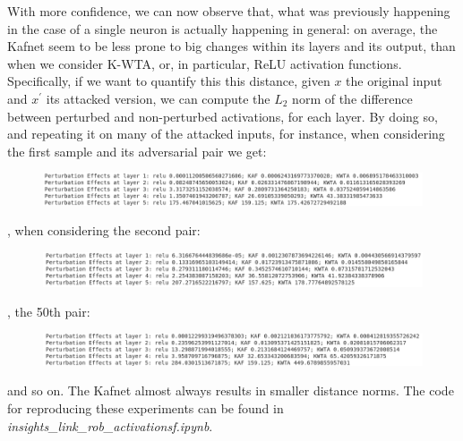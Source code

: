 \documentclass[LaM,binding=0.6cm]{./packages/sapthesis/sapthesis}
\begin{document}
        
        \newpage
        With more confidence, we can now observe that, what was previously happening in the case of a single neuron is actually happening in general: on average,
        the Kafnet seem to be less prone to big changes within its layers and its output, than when we consider K-WTA, or, in particular, ReLU activation functions.  
        Specifically, if we want to quantify this this distance, given $x$ the original input and $x^{\prime}$ its attacked version, we can compute the $L_2$ norm of the difference between perturbed 
        and non-perturbed activations, for each layer. By doing so, and repeating it on many of the attacked inputs, for instance, when considering the first sample and its adversarial pair we get:
        \begin{figure}[h!!]
            \centering
            \includegraphics[width=1.0\textwidth]{actdist31}
        \end{figure}
       \newline
        , when considering the second pair:
        \begin{figure}[h!!]
            \centering
            \includegraphics[width=1.0\textwidth]{actdist32}
        \end{figure}
        \newline
        , the 50th pair:
        \begin{figure}[h!!]
            \centering
            \includegraphics[width=1.0\textwidth]{actdist33}
        \end{figure}
        \newline
        and so on. The Kafnet almost always results in smaller distance norms. The code for reproducing these experiments can be found in \textit{insights\_link\_rob\_activationsf.ipynb}.
\end{document}
